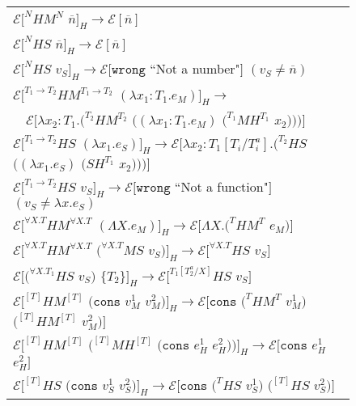 \begin{figure}[p]
\centering
\begin{tabular}{l}
$\mathscr{E}[^{N}HM^{N}$ $\overline{n}]_{H}\rightarrow\mathscr{E}[\overline{n}]$ \\
$\mathscr{E}[^{N}HS$ $\overline{n}]_{H}\rightarrow\mathscr{E}[\overline{n}]$ \\
$\mathscr{E}[^{N}HS$ $v_{S}]_{H}\rightarrow\mathscr{E}[\mathtt{wrong}$ ``Not a number"$]$ $(v_{S}\neq\overline{n})$ \\
$\mathscr{E}[^{T_{1}\rightarrow T_{2}}HM^{T_{1}\rightarrow T_{2}}$ $(\lambda x_{1}:T_{1}.e_{M})]_{H}\rightarrow$ \\

$\quad\mathscr{E}[\lambda x_{2}:T_{1}.(^{T_{2}}HM^{T_{2}}$ $((\lambda x_{1}:T_{1}.e_{M})$ $(^{T_{1}}MH^{T_{1}}$ $x_{2})))]$ \\
$\mathscr{E}[^{T_{1}\rightarrow T_{2}}HS$ $(\lambda x_{1}.e_{S})]_{H}\rightarrow\mathscr{E}[\lambda x_{2}:T_{1}[T_{i}/T^{a}_{i}].(^{T_{2}}HS$ $((\lambda x_{1}.e_{S})$ $(SH^{T_{1}}$ $x_{2})))]$ \\
$\mathscr{E}[^{T_{1}\rightarrow T_{2}}HS$ $v_{S}]_{H}\rightarrow\mathscr{E}[\mathtt{wrong}$ ``Not a function"$]$ $(v_{S}\neq\lambda x.e_{S})$ \\
$\mathscr{E}[^{\forall X.T}HM^{\forall X.T}$ $(\Lambda X.e_{M})]_{H}\rightarrow\mathscr{E}[\Lambda X.(^{T}HM^{T}$ $e_{M})]$ \\
$\mathscr{E}[^{\forall X.T}HM^{\forall X.T}$ $(^{\forall X.T}MS$ $v_{S})]_{H}\rightarrow\mathscr{E}[^{\forall X.T}HS$ $v_{S}]$ \\
$\mathscr{E}[(^{\forall X.T_{1}}HS$ $v_{S})$ $\lbrace T_{2}\rbrace]_{H}\rightarrow\mathscr{E}[^{T_{1}[T^{a}_{2}/X]}HS$ $v_{S}]$ \\
$\mathscr{E}[^{[T]}HM^{[T]}$ $(\mathtt{cons}$ $v_{M}^{1}$ $v_{M}^{2})]_{H}\rightarrow\mathscr{E}[\mathtt{cons}$ $(^{T}HM^{T}$ $v_{M}^{1})$ $(^{[T]}HM^{[T]}$ $v_{M}^{2})]$ \\
$\mathscr{E}[^{[T]}HM^{[T]}$ $(^{[T]}MH^{[T]}$ $(\mathtt{cons}$ $e_{H}^{1}$ $e_{H}^{2}))]_{H}\rightarrow\mathscr{E}[\mathtt{cons}$ $e_{H}^{1}$ $e_{H}^{2}]$ \\
$\mathscr{E}[^{[T]}HS$ $(\mathtt{cons}$ $v_{S}^{1}$ $v_{S}^{2})]_{H}\rightarrow\mathscr{E}[\mathtt{cons}$ $(^{T}HS$ $v_{S}^{1})$ $(^{[T]}HS$ $v_{S}^{2})]$ \\

\end{tabular}
\end{figure}
